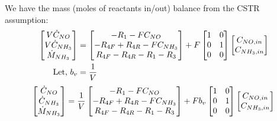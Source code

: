 We have the mass (moles of reactants in/out) balance from the CSTR assumption:
\begin{align*}
    \begin{bmatrix} V \dot C_{NO}\\ V \dot C_{NH_3} \\ \dot M_{NH_3}  \end{bmatrix} &=
    \begin{bmatrix} 
        -R_1 - F C_{NO}\\
        -R_{4F} + R_{4R} - F C_{NH_3}\\
        R_{4F} - R_{4R} - R_1 - R_3
     \end{bmatrix} +
    F \begin{bmatrix} 1 & 0 \\ 0 & 1 \\ 0 & 0 \end{bmatrix} \begin{bmatrix}  C_{NO, in} \\ C_{NH_3, in} \end{bmatrix}\\
    \text{Let, } b_v &= \frac{1}{V}\\
\end{align*}
\begin{equation} \label{eqn::mass_balance}
    \begin{bmatrix} \dot C_{NO} \\  \dot C_{NH_3} \\ \dot M_{NH_3}  \end{bmatrix} = \frac{1}{V}
    \begin{bmatrix} 
        -R_1 - F C_{NO}\\
        -R_{4F} + R_{4R} - F C_{NH_3}\\
        R_{4F} - R_{4R} - R_1 - R_3
     \end{bmatrix} +
    Fb_v \begin{bmatrix} 1 & 0 \\ 0 & 1 \\ 0 & 0 \end{bmatrix} \begin{bmatrix}  C_{NO, in} \\ C_{NH_3, in} \end{bmatrix}\\
\end{equation}




